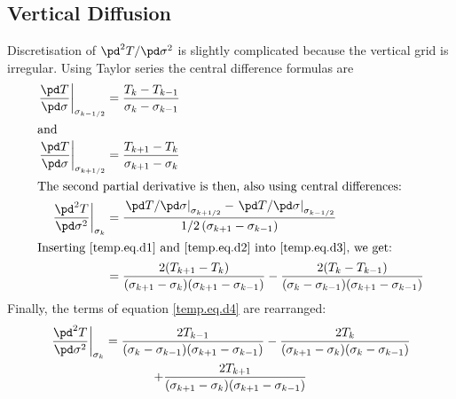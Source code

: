 \subsection{Vertical Diffusion}
Discretisation of $\pd^2T/\pd\sigma^2$ is slightly complicated because the vertical grid is irregular. Using Taylor series the central difference formulas are
\begin{subequations}
  \begin{align}
    \label{temp.eq.d1}
    \left.\frac{\pd T}{\pd\sigma}\right|_{\sigma_{k-1/2}}&=\frac{T_k-T_{k-1}}{\sigma_k-\sigma_{k-1}}\\
    \intertext{and}
    \label{temp.eq.d2}
    \left.\frac{\pd T}{\pd\sigma}\right|_{\sigma_{k+1/2}}&=\frac{T_{k+1}-T_k}{\sigma_{k+1}-\sigma_k}\\
    \intertext{The second partial derivative is then, also using central differences:}
    \label{temp.eq.d3}
    \left.\frac{\pd^2 T}{\pd\sigma^2}\right|_{\sigma_k} &= \frac{\left.{\pd T}/{\pd\sigma}\right|_{\sigma_{k+1/2}} - \left.{\pd T}/{\pd\sigma}\right|_{\sigma_{k-1/2}}}{1/2\left(\sigma_{k+1}-\sigma_{k-1}\right)}\\
    \intertext{Inserting \eqref{temp.eq.d1} and \eqref{temp.eq.d2} into \eqref{temp.eq.d3}, we get:}
    \label{temp.eq.d4}
    &=\frac{2(T_{k+1}-T_k)}{(\sigma_{k+1}-\sigma_k)(\sigma_{k+1}-\sigma_{k-1})}-\frac{2(T_k-T_{k-1})}{(\sigma_k-\sigma_{k-1})(\sigma_{k+1}-\sigma_{k-1})}
  \end{align}
\end{subequations}
Finally, the terms of equation \eqref{temp.eq.d4} are rearranged:
\begin{multline}
  \label{temp.eq.dsigma2}
  \left.\frac{\pd^2 T}{\pd\sigma^2}\right|_{\sigma_k} = \frac{2T_{k-1}}{(\sigma_k-\sigma_{k-1})(\sigma_{k+1}-\sigma_{k-1})} - \frac{2T_k}{(\sigma_{k+1}-\sigma_k)(\sigma_k-\sigma_{k-1})}\\
  + \frac{2T_{k+1}}{(\sigma_{k+1}-\sigma_k)(\sigma_{k+1}-\sigma_{k-1})}
\end{multline}

